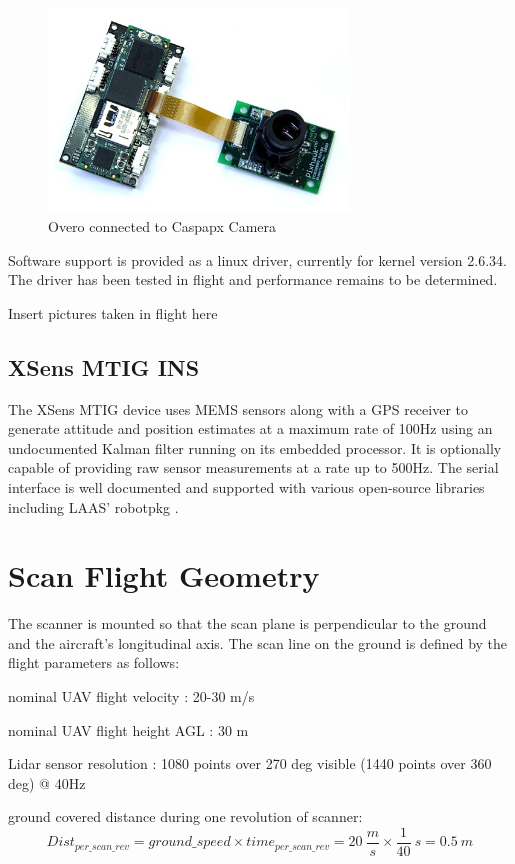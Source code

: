 \documentclass[a4paper,11pt]{report}
\begin{document}
\begin{figure}[ht]
 \centering
 \includegraphics[width=8cm]{overo_and_caspa.jpeg}
 \caption{Overo connected to Caspapx Camera}
 \label{fig:caspa}
\end{figure}

Software support is provided as a linux driver, currently for kernel version 2.6.34. The driver has been tested in flight and performance remains to be determined.

Insert pictures taken in flight here

\subsection{XSens MTIG INS}
\label{MTIG}

The XSens MTIG device uses MEMS sensors along with a GPS receiver to generate attitude and position estimates at a maximum rate of 100Hz using an undocumented Kalman filter running on its embedded processor. It is optionally capable of providing raw sensor measurements at a rate up to 500Hz. The serial interface is well documented and supported with various open-source libraries including LAAS' robotpkg \cite{robotpkg}.


\section{Scan Flight Geometry}
\label{geometry}

The scanner is mounted so that the scan plane is perpendicular to the ground and the aircraft's longitudinal axis. The scan line on the ground is defined by the flight parameters as follows:

nominal UAV flight velocity : 20-30 m/s

nominal UAV flight height AGL : 30 m

Lidar sensor resolution : 1080 points over 270 deg visible (1440 points over 360 deg) @ 40Hz

ground covered distance during one revolution of scanner:
\begin{equation}
Dist_{per\_scan\_rev} = ground\_speed \times time_{per\_scan\_rev} = 20~\frac{m}{s} \times \frac{1}{40}~s = 0.5~m 
\end{equation}
\end{document}
